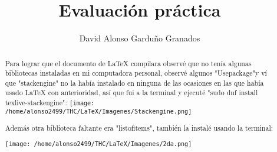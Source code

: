 \documentclass[]{article}
\title{Evaluación práctica}
\author{David Alonso Garduño Granados}
\begin{document}
\maketitle

\begin{abstract}
Para lograr que el documento de LaTeX compilara observé que no tenía algunas bibliotecas instaladas en mi computadora personal, observé algunos "Usepackage"y ví que "stackengine" no la había instalado en ninguna de las ocasiones en las que había usado LaTeX con anterioridad, así que fui a la terminal y ejecuté "sudo dnf install texlive-stackengine":
\texttt{[image: /home/alonso2499/THC/LaTeX/Imagenes/Stackengine.png]}

Además otra biblioteca faltante era "listofitems", también la instalé usando la terminal:

\texttt{[image: /home/alonso2499/THC/LaTeX/Imagenes/2da.png]}
\end{abstract}
\end{document}
